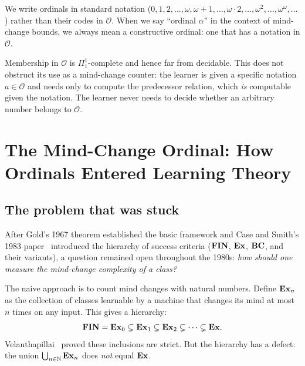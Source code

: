 \begin{notation}
\label{not:ordinal-shorthand}
We write ordinals in standard notation ($0, 1, 2, \ldots, \omega,
\omega + 1, \ldots, \omega \cdot 2, \ldots, \omega^2, \ldots,
\omega^\omega, \ldots$) rather than their codes in $\mathcal{O}$.
When we say ``ordinal $\alpha$'' in the context of mind-change bounds,
we always mean a constructive ordinal: one that has a notation in
$\mathcal{O}$.
\end{notation}

\begin{remark}
\label{rem:system-O-noncomputable}
Membership in $\mathcal{O}$ is $\Pi_1^1$-complete and hence far from
decidable.  This does not obstruct its use as a mind-change counter:
the learner is given a specific notation $a \in \mathcal{O}$ and needs
only to compute the predecessor relation, which \emph{is} computable
given the notation.  The learner never needs to decide whether an
arbitrary number belongs to $\mathcal{O}$.
\end{remark}



\section{The Mind-Change Ordinal: How Ordinals Entered Learning Theory}
\label{sec:mco-revelation}

\subsection*{The problem that was stuck}

After Gold's 1967 theorem established the basic framework and Case and
Smith's 1983 paper~\cite{CaseSmith1983} introduced the hierarchy of
success criteria ($\mathbf{FIN}$, $\mathbf{Ex}$, $\mathbf{BC}$, and their variants), a question
remained open throughout the 1980s: \emph{how should one measure the
mind-change complexity of a class?}

The naive approach is to count mind changes with natural numbers.  Define
$\mathbf{Ex}_n$ as the collection of classes learnable by a machine that changes
its mind at most $n$ times on any input.  This gives a hierarchy:
\[
  \mathbf{FIN} = \mathbf{Ex}_0 \subsetneq \mathbf{Ex}_1 \subsetneq \mathbf{Ex}_2 \subsetneq \cdots
  \subsetneq \mathbf{Ex}.
\]
Velauthapillai~\cite{Velauthapillai1989} proved these inclusions are
strict.  But the hierarchy has a defect: the union
$\bigcup_{n \in \mathbb{N}} \mathbf{Ex}_n$ does \emph{not} equal $\mathbf{Ex}$.

